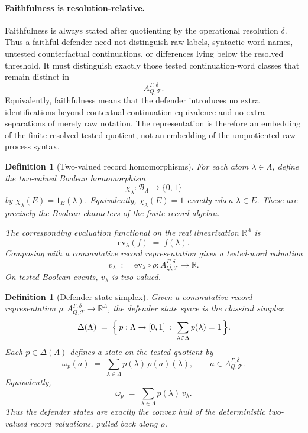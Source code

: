 \documentclass[11pt]{article}
\newtheorem{definition}[theorem]{Definition}
\newcommand{\R}{\mathbb R}
\begin{document}
\paragraph{Faithfulness is resolution-relative.}
Faithfulness is always stated after quotienting by the operational
resolution $\delta$.  Thus a faithful defender need not distinguish raw
labels, syntactic word names, untested counterfactual continuations, or
differences lying below the resolved threshold.  It must distinguish
exactly those tested continuation-word classes that remain distinct in
\[
    A^{\Gamma,\delta}_{Q,\mathcal T}.
\]
Equivalently, faithfulness means that the defender introduces no extra
identifications beyond contextual continuation equivalence and no extra
separations of merely raw notation.  The representation is therefore an
embedding of the finite resolved tested quotient, not an embedding of
the unquotiented raw process syntax.

\begin{definition}[Two-valued record homomorphisms]\label{def:two-valued-homomorphisms}
For each atom $\lambda\in\Lambda$, define the two-valued Boolean
homomorphism
\[
    \chi_\lambda:\mathcal B_\Lambda\to\{0,1\}
\]
by $\chi_\lambda(E)=1_E(\lambda)$.  Equivalently,
$\chi_\lambda(E)=1$ exactly when $\lambda\in E$.  These are precisely
the Boolean characters of the finite record algebra.

The corresponding evaluation functional on the real linearization
$\R^\Lambda$ is
\[
    \mathrm{ev}_\lambda(f) \;=\; f(\lambda).
\]
Composing with a commutative record representation gives a tested-word
valuation
\[
    v_\lambda \;:=\; \mathrm{ev}_\lambda\circ\rho
    : A^{\Gamma,\delta}_{Q,\mathcal T}\to\R.
\]
On tested Boolean events, $v_\lambda$ is two-valued.
\end{definition}

\begin{definition}[Defender state simplex]\label{def:defender-state-simplex}
Given a commutative record representation
$\rho:A^{\Gamma,\delta}_{Q,\mathcal T}\to\R^\Lambda$, the defender
state space is the classical simplex
\[
    \Delta(\Lambda)
    \;=\;
    \Bigl\{\, p:\Lambda\to[0,1] \;:\;
    \sum_{\lambda\in\Lambda}p(\lambda)=1\,\Bigr\}.
\]
Each $p\in\Delta(\Lambda)$ defines a state on the tested quotient by
\[
    \omega_p(a)
    \;=\;
    \sum_{\lambda\in\Lambda}p(\lambda)\,\rho(a)(\lambda),
    \qquad
    a\in A^{\Gamma,\delta}_{Q,\mathcal T}.
\]
Equivalently,
\[
    \omega_p \;=\;
    \sum_{\lambda\in\Lambda}p(\lambda)\,v_\lambda.
\]
Thus the defender states are exactly the convex hull of the
deterministic two-valued record valuations, pulled back along $\rho$.
\end{definition}
\end{document}
